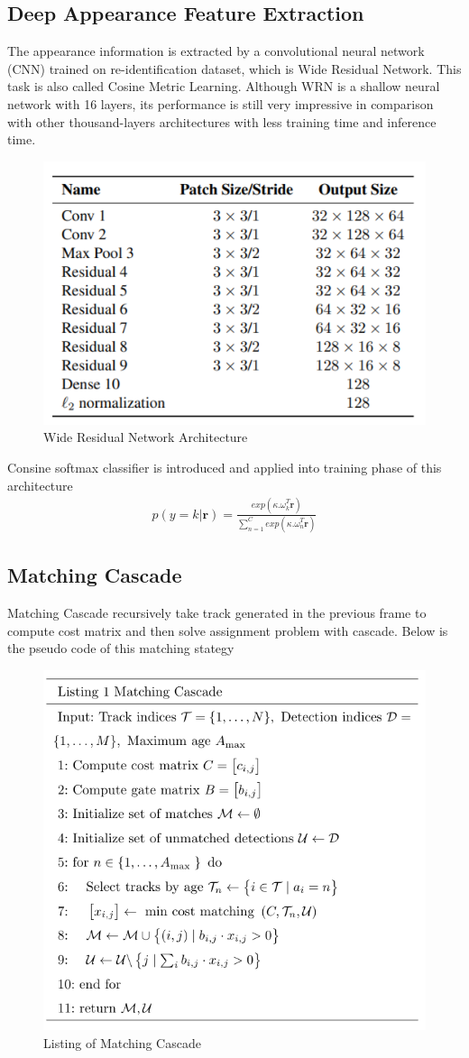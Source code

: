     \subsection{Deep Appearance Feature Extraction}
        The appearance information is extracted by a convolutional neural network (CNN) trained on re-identification dataset, which is Wide Residual Network. This task is also called Cosine Metric Learning. Although WRN is a shallow neural network with 16 layers, its performance is still very impressive in comparison with other thousand-layers architectures 
        with less training time and inference time.
        \begin{figure}[H]
            \centering
            \includegraphics[width=0.6\linewidth]{img/wide-residual.png}
            \caption{Wide Residual Network Architecture}
        \end{figure}
        Consine softmax classifier is introduced and applied into training phase of this architecture
        \begin{align}
            p(y = k | \textbf{r}) = \frac{exp(\kappa . \overset{~}{\omega}_k^T \textbf{r})}{\displaystyle\sum_{n=1}^C exp(\kappa . \overset{~}{\omega}_n^T \textbf{r})}
        \end{align}
    \subsection{Matching Cascade}
        Matching Cascade recursively take track generated in the previous frame to compute cost matrix and then solve assignment problem with cascade. Below is the pseudo code of this matching stategy 
        \begin{figure}[H]
            \centering
            \includegraphics[width=0.6\linewidth]{img/listing.png}
            \caption{Listing of Matching Cascade}
        \end{figure}
